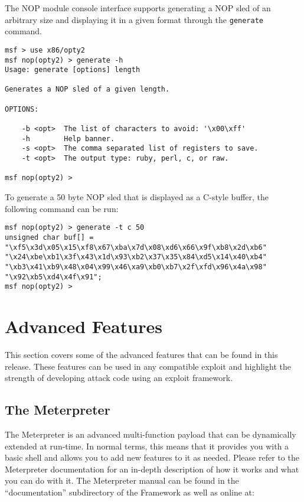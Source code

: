 \documentclass{report}
\begin{document}
\par
The NOP module console interface supports generating a NOP sled of an
arbitrary size and displaying it in a given format through the
\texttt{generate} command.

\begin{verbatim}
msf > use x86/opty2
msf nop(opty2) > generate -h
Usage: generate [options] length

Generates a NOP sled of a given length.

OPTIONS:

    -b <opt>  The list of characters to avoid: '\x00\xff'
    -h        Help banner.
    -s <opt>  The comma separated list of registers to save.
    -t <opt>  The output type: ruby, perl, c, or raw.

msf nop(opty2) >     
\end{verbatim}

\par
To generate a 50 byte NOP sled that is displayed as a C-style buffer, the
following command can be run:

\begin{verbatim}
msf nop(opty2) > generate -t c 50
unsigned char buf[] =
"\xf5\x3d\x05\x15\xf8\x67\xba\x7d\x08\xd6\x66\x9f\xb8\x2d\xb6"
"\x24\xbe\xb1\x3f\x43\x1d\x93\xb2\x37\x35\x84\xd5\x14\x40\xb4"
"\xb3\x41\xb9\x48\x04\x99\x46\xa9\xb0\xb7\x2f\xfd\x96\x4a\x98"
"\x92\xb5\xd4\x4f\x91";
msf nop(opty2) >   
\end{verbatim}

\pagebreak
\chapter{Advanced Features}

\par
This section covers some of the advanced features that can be found in this
release. These features can be used in any compatible exploit and highlight
the strength of developing attack code using an exploit framework. 

\section{The Meterpreter}
\par
The Meterpreter is an advanced multi-function payload that can be dynamically
extended at run-time. In normal terms, this means that it provides you with a
basic shell and allows you to add new features to it as needed. Please refer
to the Meterpreter documentation for an in-depth description of how it works
and what you can do with it. The Meterpreter manual can be found in the
``documentation'' subdirectory of the Framework as well as online at:
\end{document}
